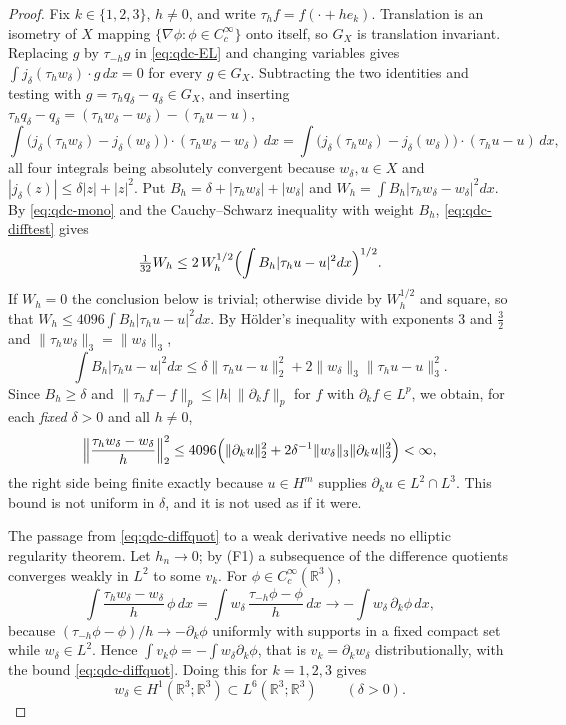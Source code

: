 \documentclass[11pt]{article}
\theoremstyle{definition}
\theoremstyle{plain}
\newcommand{\R}{\mathbb R}
\newcommand{\norm}[1]{\lVert #1\rVert}
\begin{document}
\begin{proof}
Fix $k\in\{1,2,3\}$, $h\ne0$, and write $\tau_hf=f(\cdot+he_k)$.  Translation
is an isometry of $X$ mapping $\{\nabla\phi:\phi\in C_c^\infty\}$ onto
itself, so $G_X$ is translation invariant.  Replacing $g$ by $\tau_{-h}g$ in
\eqref{eq:qdc-EL} and changing variables gives
$\int j_\delta(\tau_hw_\delta)\cdot g\,dx=0$ for every $g\in G_X$.
Subtracting the two identities and testing with
$g=\tau_hq_\delta-q_\delta\in G_X$, and inserting
$\tau_hq_\delta-q_\delta=(\tau_hw_\delta-w_\delta)-(\tau_hu-u)$,
\begin{equation}\label{eq:qdc-difftest}
 \int\bigl(j_\delta(\tau_hw_\delta)-j_\delta(w_\delta)\bigr)\cdot
 (\tau_hw_\delta-w_\delta)\,dx
 =\int\bigl(j_\delta(\tau_hw_\delta)-j_\delta(w_\delta)\bigr)\cdot
 (\tau_hu-u)\,dx ,
\end{equation}
all four integrals being absolutely convergent because
$w_\delta,u\in X$ and $|j_\delta(z)|\le\delta|z|+|z|^2$.  Put
$B_h=\delta+|\tau_hw_\delta|+|w_\delta|$ and
$W_h=\int B_h|\tau_hw_\delta-w_\delta|^2dx$.  By \eqref{eq:qdc-mono} and the
Cauchy--Schwarz inequality with weight $B_h$, \eqref{eq:qdc-difftest} gives
\[
 \tfrac1{32}W_h\le2\,W_h^{1/2}
 \Bigl(\int B_h|\tau_hu-u|^2dx\Bigr)^{1/2}.
\]
If $W_h=0$ the conclusion below is trivial; otherwise divide by $W_h^{1/2}$
and square, so that $W_h\le4096\int B_h|\tau_hu-u|^2dx$.  By H\"older's
inequality with exponents $3$ and $\frac32$ and
$\norm{\tau_hw_\delta}_3=\norm{w_\delta}_3$,
\[
 \int B_h|\tau_hu-u|^2dx
 \le\delta\norm{\tau_hu-u}_2^2+2\norm{w_\delta}_3\norm{\tau_hu-u}_3^2 .
\]
Since $B_h\ge\delta$ and $\norm{\tau_hf-f}_p\le|h|\,\norm{\partial_kf}_p$
for $f$ with $\partial_kf\in L^p$, we obtain, for each \emph{fixed} $\delta>0$
and all $h\ne0$,
\begin{equation}\label{eq:qdc-diffquot}
 \Bigl\|\frac{\tau_hw_\delta-w_\delta}h\Bigr\|_2^2
 \le4096\Bigl(\norm{\partial_ku}_2^2
 +2\delta^{-1}\norm{w_\delta}_3\norm{\partial_ku}_3^2\Bigr)<\infty,
\end{equation}
the right side being finite exactly because $u\in H^m$ supplies
$\partial_ku\in L^2\cap L^3$.  This bound is not uniform in $\delta$, and it
is not used as if it were.

The passage from \eqref{eq:qdc-diffquot} to a weak derivative needs no
elliptic regularity theorem.  Let $h_n\to0$; by (F1) a subsequence of the
difference quotients converges weakly in $L^2$ to some $v_k$.  For
$\phi\in C_c^\infty(\R^3)$,
\[
 \int\frac{\tau_hw_\delta-w_\delta}{h}\,\phi\,dx
 =\int w_\delta\,\frac{\tau_{-h}\phi-\phi}h\,dx
 \longrightarrow-\int w_\delta\,\partial_k\phi\,dx ,
\]
because $(\tau_{-h}\phi-\phi)/h\to-\partial_k\phi$ uniformly with supports
in a fixed compact set while $w_\delta\in L^2$.  Hence
$\int v_k\phi=-\int w_\delta\partial_k\phi$, that is $v_k=\partial_kw_\delta$
distributionally, with the bound \eqref{eq:qdc-diffquot}.  Doing this for
$k=1,2,3$ gives
\begin{equation}\label{eq:qdc-H1}
 w_\delta\in H^1(\R^3;\R^3)\subset L^6(\R^3;\R^3)\qquad(\delta>0).
\end{equation}


\end{proof}
\end{document}
